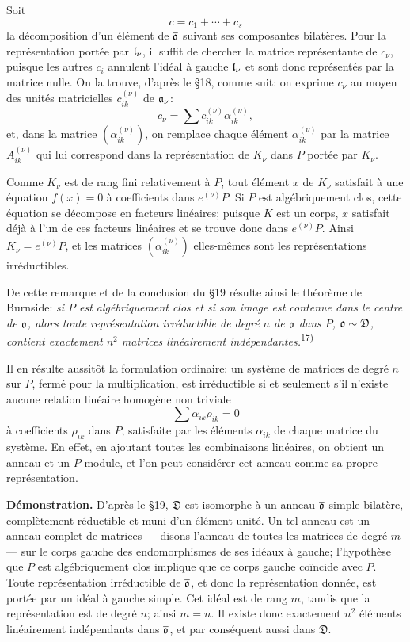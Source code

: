 Soit
\[
        c=c_1+\cdots+c_s
\]
la décomposition d'un élément de $\overline{\mathfrak{o}}$ suivant ses composantes bilatères. Pour la représentation portée par $\mathfrak{l}_\nu$, il suffit de chercher la matrice représentante de $c_\nu$, puisque les autres $c_i$ annulent l'idéal à gauche $\mathfrak{l}_\nu$ et sont donc représentés par la matrice nulle. On la trouve, d'après le \S{}18, comme suit: on exprime $c_\nu$ au moyen des unités matricielles $c_{ik}^{(\nu)}$ de $\mathfrak{a}_\nu$:
\[
        c_\nu=\sum c_{ik}^{(\nu)}\alpha_{ik}^{(\nu)},
\]
et, dans la matrice $(\alpha_{ik}^{(\nu)})$, on remplace chaque élément $\alpha_{ik}^{(\nu)}$ par la matrice $A_{ik}^{(\nu)}$ qui lui correspond dans la représentation de $K_\nu$ dans $P$ portée par $K_\nu$.

Comme $K_\nu$ est de rang fini relativement à $P$, tout élément $x$ de $K_\nu$ satisfait à une équation $f(x)=0$ à coefficients dans $e^{(\nu)}P$. Si $P$ est algébriquement clos, cette équation se décompose en facteurs linéaires; puisque $K$ est un corps, $x$ satisfait déjà à l'un de ces facteurs linéaires et se trouve donc dans $e^{(\nu)}P$. Ainsi $K_\nu=e^{(\nu)}P$, et les matrices $(\alpha_{ik}^{(\nu)})$ elles-mêmes sont les représentations irréductibles.

De cette remarque et de la conclusion du \S{}19 résulte ainsi le théorème de Burnside: \emph{si $P$ est algébriquement clos et si son image est contenue dans le centre de $\mathfrak{o}$, alors toute représentation irréductible de degré $n$ de $\mathfrak{o}$ dans $P$, $\mathfrak{o}\sim\mathfrak D$, contient exactement $n^2$ matrices linéairement indépendantes.}\textsuperscript{17)}

Il en résulte aussitôt la formulation ordinaire: un système de matrices de degré $n$ sur $P$, fermé pour la multiplication, est irréductible si et seulement s'il n'existe aucune relation linéaire homogène non triviale
\[
        \sum \alpha_{ik}\rho_{ik}=0
\]
à coefficients $\rho_{ik}$ dans $P$, satisfaite par les éléments $\alpha_{ik}$ de chaque matrice du système. En effet, en ajoutant toutes les combinaisons linéaires, on obtient un anneau et un $P$-module, et l'on peut considérer cet anneau comme sa propre représentation.

\textbf{Démonstration.} D'après le \S{}19, $\mathfrak D$ est isomorphe à un anneau $\overline{\mathfrak{o}}$ simple bilatère, complètement réductible et muni d'un élément unité. Un tel anneau est un anneau complet de matrices --- disons l'anneau de toutes les matrices de degré $m$ --- sur le corps gauche des endomorphismes de ses idéaux à gauche; l'hypothèse que $P$ est algébriquement clos implique que ce corps gauche coïncide avec $P$. Toute représentation irréductible de $\overline{\mathfrak{o}}$, et donc la représentation donnée, est portée par un idéal à gauche simple. Cet idéal est de rang $m$, tandis que la représentation est de degré $n$; ainsi $m=n$. Il existe donc exactement $n^2$ éléments linéairement indépendants dans $\overline{\mathfrak{o}}$, et par conséquent aussi dans $\mathfrak D$.

